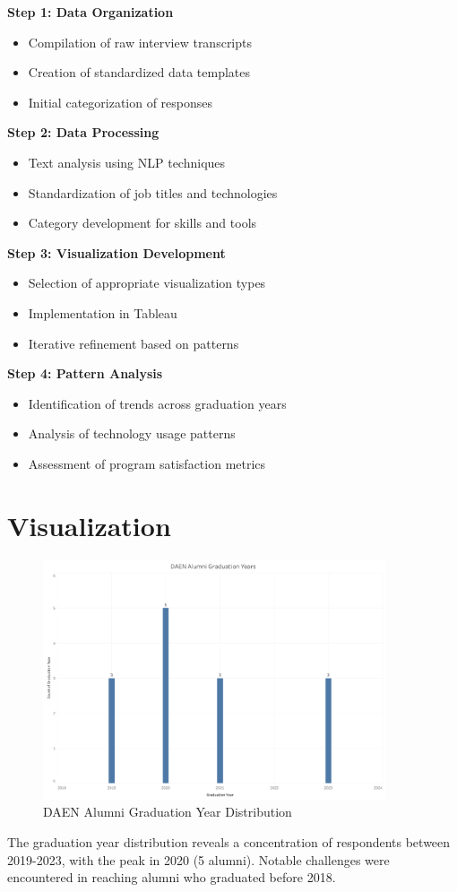 \documentclass[12pt,a4paper]{article}
\begin{document}
\noindent\textbf{Step 1: Data Organization}
\begin{itemize}
\item Compilation of raw interview transcripts
\item Creation of standardized data templates
\item Initial categorization of responses
\end{itemize}
\textbf{Step 2: Data Processing}
\begin{itemize}
\item Text analysis using NLP techniques
\item Standardization of job titles and technologies
\item Category development for skills and tools
\end{itemize}
\textbf{Step 3: Visualization Development}
\begin{itemize}
\item Selection of appropriate visualization types
\item Implementation in Tableau
\item Iterative refinement based on patterns
\end{itemize}
\textbf{Step 4: Pattern Analysis}
\begin{itemize}
\item Identification of trends across graduation years
\item Analysis of technology usage patterns
\item Assessment of program satisfaction metrics
\end{itemize}

\newpage

\section{Visualization}
\begin{figure}[H]
    \centering
    \includegraphics[width=0.9\textwidth]{visualizations/graduation-year.png}
    \caption{DAEN Alumni Graduation Year Distribution}
    \label{fig:graudation-year}
\end{figure}
The graduation year distribution reveals a concentration of respondents between 2019-2023, with the peak in 2020 (5 alumni). Notable challenges were encountered in reaching alumni who graduated before 2018.
\end{document}
